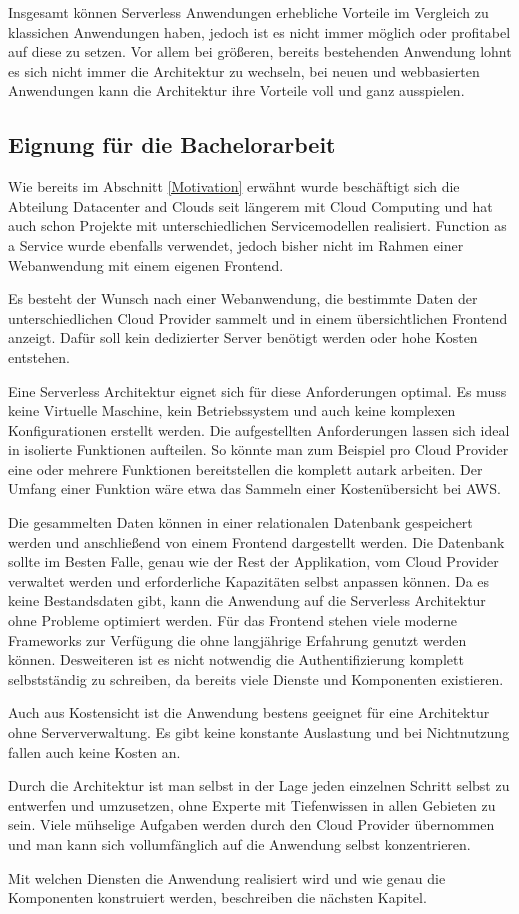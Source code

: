Insgesamt können Serverless Anwendungen erhebliche Vorteile im Vergleich zu klassichen Anwendungen haben, jedoch
ist es nicht immer möglich oder profitabel auf diese zu setzen. Vor allem bei größeren, bereits bestehenden Anwendung lohnt es
sich nicht immer die Architektur zu wechseln, bei neuen und webbasierten Anwendungen kann
die Architektur ihre Vorteile voll und ganz ausspielen.

\subsection{Eignung für die Bachelorarbeit}
Wie bereits im Abschnitt \frqq \ref{Motivation}  \flqq{} erwähnt wurde beschäftigt sich die Abteilung Datacenter and Clouds
seit längerem mit Cloud Computing und hat auch schon Projekte mit unterschiedlichen Servicemodellen realisiert. Function as a Service wurde ebenfalls
verwendet, jedoch bisher nicht im Rahmen einer Webanwendung mit einem eigenen Frontend.

Es besteht der Wunsch nach einer Webanwendung, die bestimmte Daten der unterschiedlichen Cloud Provider sammelt und in einem übersichtlichen Frontend anzeigt.
Dafür soll kein dedizierter Server benötigt werden oder hohe Kosten entstehen.

Eine Serverless Architektur eignet sich für diese Anforderungen optimal. Es muss keine Virtuelle Maschine, kein Betriebssystem und auch keine
komplexen Konfigurationen erstellt werden. Die aufgestellten Anforderungen lassen sich ideal in isolierte Funktionen aufteilen.
So könnte man zum Beispiel pro Cloud Provider eine oder mehrere Funktionen bereitstellen die komplett autark arbeiten. Der Umfang einer Funktion
wäre etwa das Sammeln einer Kostenübersicht bei AWS.

Die gesammelten Daten können in einer relationalen Datenbank gespeichert werden und anschließend von einem Frontend dargestellt werden.
Die Datenbank sollte im Besten Falle, genau wie der Rest der Applikation, vom Cloud Provider verwaltet werden und erforderliche Kapazitäten
selbst anpassen können.
Da es keine Bestandsdaten gibt, kann die Anwendung auf die Serverless Architektur ohne Probleme optimiert werden.
Für das Frontend stehen viele moderne Frameworks zur Verfügung die ohne langjährige Erfahrung genutzt werden können. Desweiteren ist es
nicht notwendig die Authentifizierung komplett selbstständig zu schreiben, da bereits viele Dienste und Komponenten existieren.

Auch aus Kostensicht ist die Anwendung bestens geeignet für eine Architektur ohne Serververwaltung. Es gibt keine konstante Auslastung
und bei Nichtnutzung fallen auch keine Kosten an.


Durch die Architektur ist man selbst in der Lage jeden einzelnen Schritt selbst zu entwerfen und umzusetzen, ohne Experte mit Tiefenwissen
in allen Gebieten zu sein. Viele mühselige Aufgaben werden durch den Cloud Provider übernommen und man kann sich vollumfänglich auf die
Anwendung selbst konzentrieren.

Mit welchen Diensten die Anwendung realisiert wird und wie genau die Komponenten konstruiert werden, beschreiben die nächsten Kapitel.




